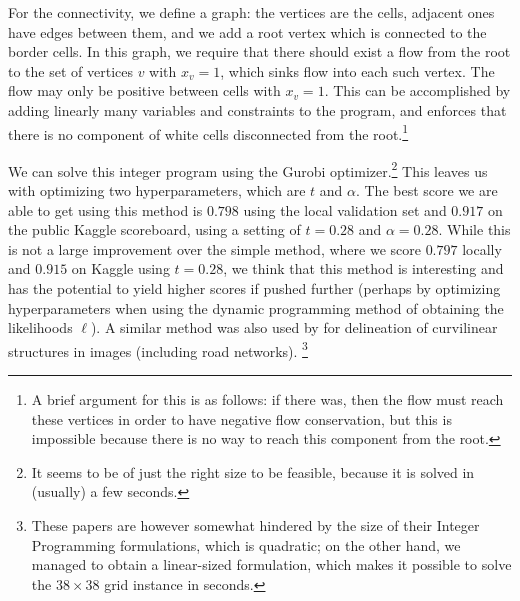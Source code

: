 For the connectivity, we define a graph: the vertices are the cells, adjacent ones have edges between them, and we add a root vertex which is connected to the border cells. In this graph, we require that there should exist a flow from the root to the set of vertices $v$ with $x_v = 1$, which sinks flow into each such vertex. The flow may only be positive between cells with $x_v = 1$. This can be accomplished by adding linearly many variables and constraints to the program, and enforces that there is no component of white cells disconnected from the root.\footnote{A brief argument for this is as follows: if there was, then the flow must reach these vertices in order to have negative flow conservation, but this is impossible because there is no way to reach this component from the root.}

We can solve this integer program using the Gurobi optimizer.\footnote{It seems to be of just the right size to be feasible, because it is solved in (usually) a few seconds.} This leaves us with optimizing two hyperparameters, which are $t$ and $\alpha$. The best score we are able to get using this method is $0.798$ using the local validation set and $0.917$ on the public Kaggle scoreboard, using a setting of $t = 0.28$ and $\alpha = 0.28$. While this is not a large improvement over the simple method, where we score $0.797$ locally and $0.915$ on Kaggle using $t = 0.28$, we think that this method is interesting and has the potential to yield higher scores if pushed further (perhaps by optimizing hyperparameters when using the dynamic programming method of obtaining the likelihoods $\ell$). A similar method was also used by \cite{??,??} for delineation of curvilinear structures in images (including road networks).
\footnote{These papers are however somewhat hindered by the size of their Integer Programming formulations, which is quadratic; on the other hand, we managed to obtain a linear-sized formulation, which makes it possible to solve the $38 \times 38$ grid instance in seconds.}




